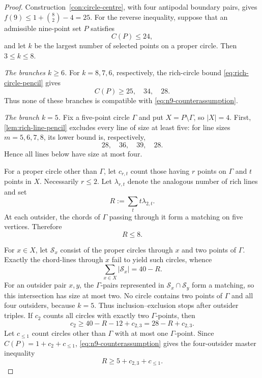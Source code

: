\begin{proof}
Construction~\ref{con:circle-centre}, with four antipodal boundary pairs,
gives \(f(9)\leq1+\binom82-4=25\).  For the reverse inequality, suppose
that an admissible nine-point set \(P\) satisfies
\begin{equation}\label{eq:n9-counterassumption}
 C(P)\leq24,
\end{equation}
and let \(k\) be the largest number of selected points on a proper circle.
Then \(3\leq k\leq8\).

\smallskip
\noindent\emph{The branches \(k\geq6\).}
For \(k=8,7,6\), respectively, the rich-circle bound
\eqref{eq:rich-circle-pencil} gives
\[
 C(P)\geq25,\quad34,\quad28.
\]
Thus none of these branches is compatible with
\eqref{eq:n9-counterassumption}.

\smallskip
\noindent\emph{The branch \(k=5\).}
Fix a five-point circle \(\Gamma\) and put
\(X=P\setminus\Gamma\), so \(|X|=4\).  First,
\cref{lem:rich-line-pencil} excludes every line of size at least five:
for line sizes \(m=5,6,7,8\), its lower bound is, respectively,
\[
 28,\quad36,\quad39,\quad28.
\]
Hence all lines below have size at most four.

For a proper circle other than \(\Gamma\), let \(c_{r,t}\) count those
having \(r\) points on \(\Gamma\) and \(t\) points in \(X\).  Necessarily
\(r\leq2\).  Let \(\lambda_{r,t}\) denote the analogous number of rich
lines and set
\begin{equation}\label{eq:n9-R}
 R:=\sum_t t\lambda_{2,t}.
\end{equation}
At each outsider, the chords of \(\Gamma\) passing through it form a
matching on five vertices.  Therefore
\begin{equation}\label{eq:n9-R-cap}
 R\leq8.
\end{equation}

For \(x\in X\), let \(\mathcal S_x\) consist of the proper circles through
\(x\) and two points of \(\Gamma\).  Exactly the chord-lines through \(x\)
fail to yield such circles, whence
\[
 \sum_{x\in X}|\mathcal S_x|=40-R.
\]
For an outsider pair \(x,y\), the \(\Gamma\)-pairs represented in
\(\mathcal S_x\cap\mathcal S_y\) form a matching, so this intersection has
size at most two.  No circle contains two points of \(\Gamma\) and all four
outsiders, because \(k=5\).  Thus inclusion--exclusion stops after outsider
triples.  If \(c_2\) counts all circles with exactly two
\(\Gamma\)-points, then
\begin{equation}\label{eq:n9-four-outsider-union}
 c_2\geq40-R-12+c_{2,3}=28-R+c_{2,3}.
\end{equation}
Let \(c_{\leq1}\) count circles other than \(\Gamma\) with at most one
\(\Gamma\)-point.  Since \(C(P)=1+c_2+c_{\leq1}\),
\eqref{eq:n9-counterassumption} gives the four-outsider master inequality
\begin{equation}\label{eq:n9-four-outsider-master}
 R\geq5+c_{2,3}+c_{\leq1}.
\end{equation}


\end{proof}
